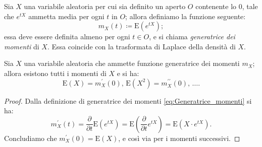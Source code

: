         \begin{defn}
            Sia $X$ una variabile aleatoria per cui sia definito un aperto $O$ contenente lo 0, tale che $e^{tX}$ ammetta media per ogni $t$ in $O$; allora definiamo la funzione seguente:
            \begin{equation}\label{eq:Generatrice_momenti}
                m_X(t) \coloneqq \text{E}(e^{tX})
            ;\end{equation}
            essa deve essere definita almeno per ogni $t \in O$, e si chiama \emph{generatrice dei momenti} di $X$.
            Essa coincide con la trasformata di Laplace della densità di $X$.
        \end{defn}
        \begin{prty}
            Sia $X$ una variabile aleatoria che ammette funzione generatrice dei momenti $m_X$; allora esistono tutti i momenti di $X$ e si ha: \[
                \text{E}(X) = m_X^{\prime}(0),\, \text{E}(X^2) = m_X^{\prime\prime}(0),\, \ldots
            .\] 
        \end{prty}
        \begin{proof}
            Dalla definizione di generatrice dei momenti \eqref{eq:Generatrice_momenti} si ha: \[
                m_X^{\prime}(t) = \frac{\partial}{\partial t}\text{E}(e^{tX})
                = \text{E}\left(\frac{\partial}{\partial t} e^{tX}\right)
                = \text{E}(X\cdot e^{tX})
            .\] Concludiamo che $m_X^{\prime}(0) = \text{E}(X)$, e così via per i momenti successivi.
        \end{proof}
